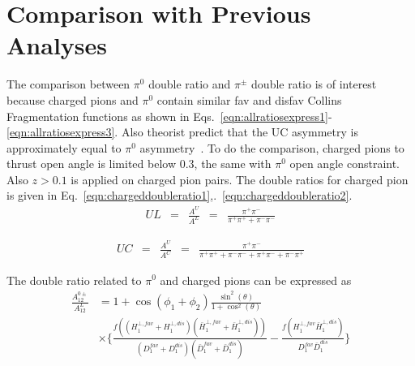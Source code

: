 \section{\texorpdfstring{Comparison with Previous Analyses}{Comparison with Previous Analyses}}
\label{sec:comparewpreviouse}
The comparison between $\pi^0$ double ratio and $\pi^{\pm}$ double ratio is of interest because charged pions and $\pi^0$ contain similar fav and disfav Collins Fragmentation functions as shown in Eqs.~\eqref{eqn:allratiosexpress1}-\eqref{eqn:allratiosexpress3}. Also theorist predict that the UC asymmetry is approximately equal to $\pi^0$ asymmetry~\cite{CollinsInSIDISandEE}. To do the comparison, charged pions to thrust open angle is limited below 0.3, the same with $\pi^0$ open angle constraint. Also $z>0.1$ is applied on charged pion pairs. The double ratios for charged pion is given in Eq.~\eqref{eqn:chargeddoubleratio1},.~\eqref{eqn:chargeddoubleratio2}. 
\begin{equation}
\begin{aligned}
UL&=&\frac{A^U}{A^L}&=&\frac{\pi^+\pi^-}{\pi^+\pi^++\pi^-\pi^-}
\label{eqn:chargeddoubleratio1}
\end{aligned}
\end{equation}

\begin{equation}
\begin{aligned}
UC&=&\frac{A^U}{A^C}&=&\frac{\pi^+\pi^-}{\pi^+\pi^++\pi^-\pi^-+\pi^+\pi^-+\pi^-\pi^+}
\label{eqn:chargeddoubleratio2}
\end{aligned}
\end{equation}


The double ratio related to $\pi^0$ and charged pions can be expressed as\cite{BabarCharged}\cite{ChargedPionResult2}
\begin{equation}
\begin{aligned}
\frac{A^{0\pm}_{12}}{A^L_{12}}&=1+\cos(\phi_1+\phi_2)\frac{\sin^2(\theta)}{1+\cos^2(\theta)} \\
&\times\bigg\{\frac{f((H^{\bot,fav}_1+H^{\bot,dis}_1)(\bar{H}^{\bot,fav}_1+\bar{H}^{\bot,dis}_1))}{(D^{fav}_1+D^{dis}_1)(\bar{D}^{fav}_1+\bar{D}^{dis}_1)}-\frac{f(H^{\bot,fav}_1\bar{H}^{\bot,dis}_1)}{D^{fav}_1\bar{D}^{dis}_1} \bigg\}  
\end{aligned}
\label{eqn:allratiosexpress1}
\end{equation}

